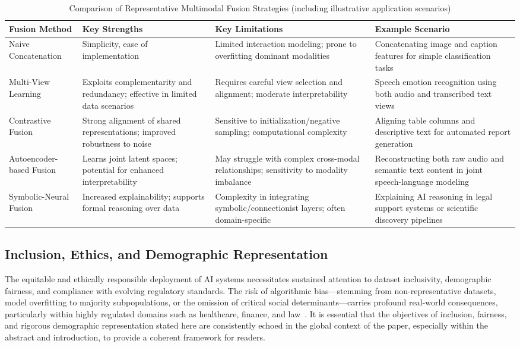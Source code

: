 \documentclass[sigconf]{acmart}
\begin{document}
\begin{table*}[htbp]
\centering
\caption{Comparison of Representative Multimodal Fusion Strategies (including illustrative application scenarios)}
\label{tab:fusion_comparison}
\begin{adjustbox}{max width=\textwidth}
\begin{tabular}{@{}llll@{}}
\toprule
\textbf{Fusion Method} & \textbf{Key Strengths} & \textbf{Key Limitations} & \textbf{Example Scenario} \\
\midrule
Naive Concatenation & Simplicity, ease of implementation & Limited interaction modeling; prone to overfitting dominant modalities & Concatenating image and caption features for simple classification tasks \\
Multi-View Learning & Exploits complementarity and redundancy; effective in limited data scenarios & Requires careful view selection and alignment; moderate interpretability & Speech emotion recognition using both audio and transcribed text views \\
Contrastive Fusion & Strong alignment of shared representations; improved robustness to noise & Sensitive to initialization/negative sampling; computational complexity & Aligning table columns and descriptive text for automated report generation~\cite{ref74} \\
Autoencoder-based Fusion & Learns joint latent spaces; potential for enhanced interpretability & May struggle with complex cross-modal relationships; sensitivity to modality imbalance & Reconstructing both raw audio and semantic text content in joint speech-language modeling \\
Symbolic-Neural Fusion & Increased explainability; supports formal reasoning over data & Complexity in integrating symbolic/connectionist layers; often domain-specific & Explaining AI reasoning in legal support systems or scientific discovery pipelines~\cite{ref46,ref49} \\
\bottomrule
\end{tabular}
\end{adjustbox}
\end{table*}

\subsection{Inclusion, Ethics, and Demographic Representation}

The equitable and ethically responsible deployment of AI systems necessitates sustained attention to dataset inclusivity, demographic fairness, and compliance with evolving regulatory standards. The risk of algorithmic bias—stemming from non-representative datasets, model overfitting to majority subpopulations, or the omission of critical social determinants—carries profound real-world consequences, particularly within highly regulated domains such as healthcare, finance, and law~\cite{ref1,ref2,ref10,ref21,ref22,ref23,ref42,ref43,ref44,ref49,ref52,ref53,ref65}. It is essential that the objectives of inclusion, fairness, and rigorous demographic representation stated here are consistently echoed in the global context of the paper, especially within the abstract and introduction, to provide a coherent framework for readers.
\end{document}
